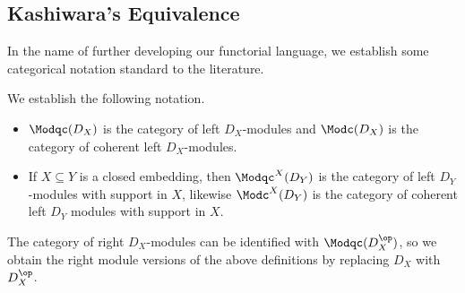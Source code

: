 \subsection{Kashiwara's Equivalence}\label{sec:kashiwara}
In the name of further developing our functorial language, we establish some categorical notation standard to the literature.
\begin{defn}[Notation]\label{defn:categories-of-D-mod}
	We establish the following notation.
	\begin{itemize}
		\item $\Modqc(D_X)$ is the category of left $D_X$-modules and $\Modc(D_X)$ is the category of coherent left $D_X$-modules.
		\item If $X\subseteq Y$ is a closed embedding, then $\Modqc^X(D_Y)$ is the category of left $D_Y$-modules with support in $X$, likewise $\Modc^X(D_Y)$ is the category of coherent left $D_Y$ modules with support in $X$.
	\end{itemize}
	The category of right $D_X$-modules can be identified with $\Modqc(D_X^{\op})$, so we obtain the right module versions of the above definitions by replacing $D_X$ with $D_X^{\op}$.
\end{defn}

